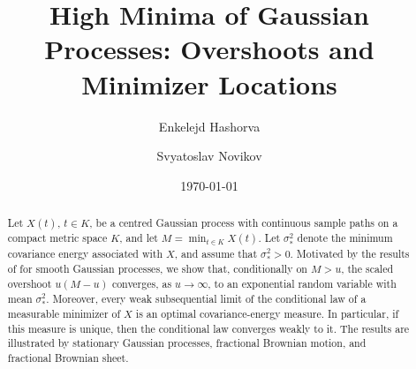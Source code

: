 \documentclass[11pt]{amsart}
\title{High Minima of Gaussian Processes: Overshoots and Minimizer Locations}
\author{Enkelejd Hashorva}
\author{Svyatoslav Novikov}
\date{\today}
\theoremstyle{definition}
\theoremstyle{remark}
\begin{document}
\begin{abstract}
Let $X(t)$, $t\in K$, be a centred Gaussian process with continuous sample
paths on a compact metric space $K$, and let
$M=\min_{t\in K}X(t)$. Let $\sigma_*^2$ denote the minimum covariance
energy associated with $X$, and assume that $\sigma_*^2>0$.  Motivated by the results of
\cite{chakrabarty2018asymptotic} for smooth Gaussian processes, we show that,
conditionally on $M>u$, the scaled overshoot $u(M-u)$ converges, as
$u\to\infty$, to an exponential random variable with mean $\sigma_*^2$.
Moreover, every weak subsequential limit of the conditional law of a
measurable minimizer of $X$ is an optimal covariance-energy measure.  In
particular, if this measure is unique, then the conditional law converges
weakly to it.  The results are illustrated by stationary Gaussian processes,
fractional Brownian motion, and fractional Brownian sheet.
\end{abstract}

\maketitle
\end{document}
